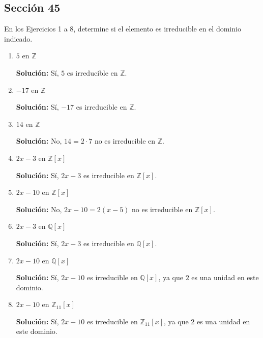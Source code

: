 
\subsection*{Sección 45}

\noindent En los Ejercicios 1 a 8, determine si el elemento es irreducible en el dominio indicado.
\begin{enumerate}
    \item $5$ en $\mathbb{Z}$
    
    \textbf{Solución:} Sí, $5$ es irreducible en $\mathbb{Z}$.

    \item $-17$ en $\mathbb{Z}$
    
    \textbf{Solución:} Sí, $-17$ es irreducible en $\mathbb{Z}$.

    \item $14$ en $\mathbb{Z}$
    
    \textbf{Solución:} No, $14 = 2 \cdot 7$ no es irreducible en $\mathbb{Z}$.

    \item $2x - 3$ en $\mathbb{Z}[x]$
    
    \textbf{Solución:} Sí, $2x - 3$ es irreducible en $\mathbb{Z}[x]$.

    \item $2x - 10$ en $\mathbb{Z}[x]$
    
    \textbf{Solución:} No, $2x - 10 = 2(x - 5)$ no es irreducible en $\mathbb{Z}[x]$.

    \item $2x - 3$ en $\mathbb{Q}[x]$
    
    \textbf{Solución:} Sí, $2x - 3$ es irreducible en $\mathbb{Q}[x]$.

    \item $2x - 10$ en $\mathbb{Q}[x]$
    
    \textbf{Solución:} Sí, $2x - 10$ es irreducible en $\mathbb{Q}[x]$, ya que $2$ es una unidad en este dominio.

    \item $2x - 10$ en $\mathbb{Z}_{11}[x]$
    
    \textbf{Solución:} Sí, $2x - 10$ es irreducible en $\mathbb{Z}_{11}[x]$, ya que $2$ es una unidad en este dominio.
\end{enumerate}
    

